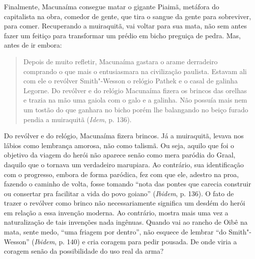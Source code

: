 Finalmente, Macunaíma consegue matar o gigante Piaimã, metáfora do
capitalista na obra, comedor de gente, que tira o sangue da gente para
sobreviver, para comer. Recuperando a muiraquitã, vai voltar para sua
mata, não sem antes fazer um feitiço para transformar um prédio em bicho
preguiça de pedra. Mas, antes de ir embora:

\begin{quote}
Depois de muito refletir, Macunaíma gastara o arame derradeiro comprando
o que mais o entusiasmara na civilização paulista. Estavam ali com ele o
revólver Smith"-Wesson o relógio Pathek e o casal de galinha Legorne. Do
revólver e do relógio Macunaíma fizera os brincos das orelhas e trazia
na mão uma gaiola com o galo e a galinha. Não possuía mais nem um tostão
do que ganhara no bicho porém lhe balangando no beiço furado pendia a
muiraquitã (\emph{Idem}, p. 136).
\end{quote}

Do revólver e do relógio, Macunaíma fizera brincos. Já a muiraquitã,
levava nos lábios como lembrança amorosa, não como talismã. Ou seja,
aquilo que foi o objetivo da viagem do herói não aparece senão como mera
paródia do Graal, daquilo que o tornava um verdadeiro marupiara. Ao
contrário, sua identificação com o progresso, embora de forma paródica,
fez com que ele, adestro na proa, fazendo o caminho de volta, fosse
tomando ``nota das pontes que carecia construir ou consertar pra
facilitar a vida do povo goiano'' (\emph{Ibidem}, p. 136). O fato de
trazer o revólver como brinco não necessariamente significa um desdém do
herói em relação a essa invenção moderna. Ao contrário, mostra mais uma
vez a naturalização de tais invenções nada ingênuas. Quando vai ao
rancho de Oibê na mata, sente medo, ``uma friagem por dentro'', não
esquece de lembrar ``do Smith"-Wesson'' (\emph{Ibidem}, p. 140) e cria
coragem para pedir pousada. De onde viria a coragem senão da
possibilidade do uso real da arma?

